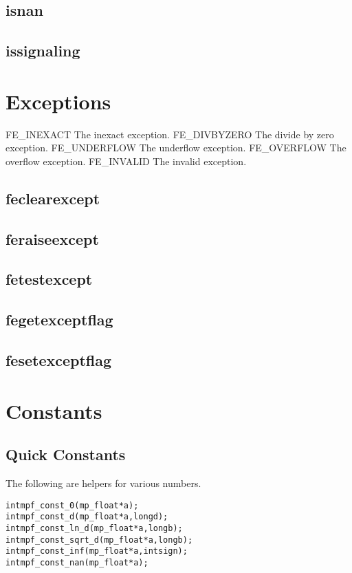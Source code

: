 \documentclass[a4paper]{book}
\theoremstyle{definition}
\theoremstyle{remark}
\begin{document}
\subsection{isnan}
\subsection{issignaling}

\section{Exceptions}
FE_INEXACT
    The inexact exception. 
FE_DIVBYZERO
    The divide by zero exception. 
FE_UNDERFLOW
    The underflow exception. 
FE_OVERFLOW
    The overflow exception. 
FE_INVALID
    The invalid exception. 

\subsection{feclearexcept}
\subsection{feraiseexcept}
\subsection{fetestexcept}
\subsection{fegetexceptflag}
\subsection{fesetexceptflag}

\section{Constants}

\subsection{Quick Constants}
The following are helpers for various numbers.

     
\begin{alltt}
int  mpf_const_0(mp_float *a);
int  mpf_const_d(mp_float *a, long d);
int  mpf_const_ln_d(mp_float *a, long b);
int  mpf_const_sqrt_d(mp_float *a, long b);
int  mpf_const_inf(mp_float * a, int sign);
int  mpf_const_nan(mp_float * a);
\end{alltt}
\end{document}
